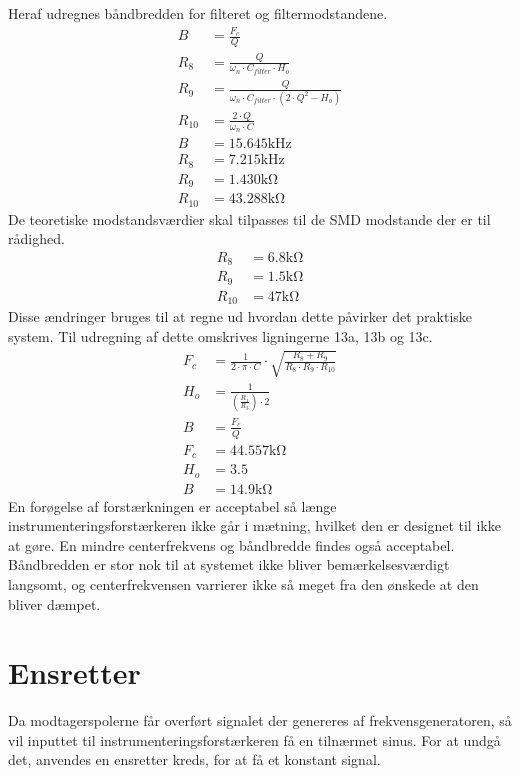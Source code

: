 Heraf udregnes båndbredden for filteret og filtermodstandene. \cite[Side. 209]{Huelsman1993}
\begin{align}
B & = \frac{F_c}{Q} \\
R_8 & = \frac{Q}{\omega_n \cdot C_{filter} \cdot H_o } \\
R_9 & = \frac{Q}{ \omega_n \cdot C_{filter} \cdot \left( 2 \cdot Q^2 - H_o \right) } \\
R_{10} & = \frac{2 \cdot Q}{ \omega_n \cdot C} \\
B & = 15.645 \si{\kilo\hertz} \nonumber \\
R_8 & = 7.215 \si{\kilo\hertz} \nonumber \\
R_9 & = 1.430 \si{\kilo\ohm} \nonumber \\
R_{10} & = 43.288 \si{\kilo\ohm} \nonumber 
\end{align}
De teoretiske modstandsværdier skal tilpasses til de SMD modstande der er til rådighed.
\begin{align}
	R_8 & = 6.8 \si{\kilo\ohm} \nonumber \\
	R_9 & = 1.5 \si{\kilo\ohm} \nonumber \\
	R_{10} & = 47 \si{\kilo\ohm} \nonumber
\end{align}
Disse ændringer bruges til at regne ud hvordan dette påvirker det praktiske system. Til udregning af dette omskrives ligningerne 13a, 13b og 13c. \cite[Side. 208]{Huelsman1993}
\begin{align}
	F_c & = \frac{1}{2 \cdot \pi \cdot C} \cdot \sqrt{\frac{R_8+R_9}{R_8 \cdot R_9 \cdot R_{10}}} \\
	H_o & = \frac{1}{\left( \frac{R_1}{R_3} \right) \cdot 2} \\
	B & = \frac{F_c}{Q} \\
	F_c & = 44.557 \si{\kilo\ohm} \nonumber \\
	H_o & = 3.5 \nonumber \\
	B & = 14.9 \si{\kilo\ohm} \nonumber
\end{align}
En forøgelse af forstærkningen er acceptabel så længe instrumenteringsforstærkeren ikke går i mætning, hvilket den er designet til ikke at gøre. En mindre centerfrekvens og båndbredde findes også acceptabel. Båndbredden er stor nok til at systemet ikke bliver bemærkelsesværdigt langsomt, og centerfrekvensen varrierer ikke så meget fra den ønskede at den bliver dæmpet.
\section{Ensretter}
Da modtagerspolerne får overført signalet der genereres af frekvensgeneratoren, så vil inputtet til instrumenteringsforstærkeren få en tilnærmet sinus. 
For at undgå det, anvendes en ensretter kreds, for at få et konstant signal.

